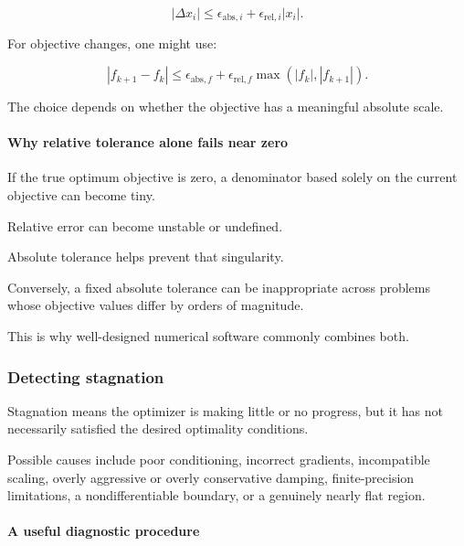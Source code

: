 \[
|\Delta x_i| \le \epsilon_{\mathrm{abs},i} + \epsilon_{\mathrm{rel},i}|x_i|.
\]

For objective changes, one might use:

\[
|f_{k+1}-f_k| \le \epsilon_{\mathrm{abs},f} + \epsilon_{\mathrm{rel},f}\max(|f_k|,|f_{k+1}|).
\]

The choice depends on whether the objective has a meaningful absolute scale.

\paragraph{Why relative tolerance alone fails near zero}\label{02-foundations-ii-ch027-why-relative-tolerance-alone-fails-near-zero}

\hypertarget{02-foundations-ii-ch027-why-relative-tolerance-alone-fails-near-zero}{}

If the true optimum objective is zero, a denominator based solely on the current objective can become tiny.

Relative error can become unstable or undefined.

Absolute tolerance helps prevent that singularity.

Conversely, a fixed absolute tolerance can be inappropriate across problems whose objective values differ by orders of magnitude.

This is why well-designed numerical software commonly combines both.

\subsubsection{Detecting stagnation}\label{02-foundations-ii-ch027-detecting-stagnation}

\hypertarget{02-foundations-ii-ch027-detecting-stagnation}{}

Stagnation means the optimizer is making little or no progress, but it has not necessarily satisfied the desired optimality conditions.

Possible causes include poor conditioning, incorrect gradients, incompatible scaling, overly aggressive or overly conservative damping, finite-precision limitations, a nondifferentiable boundary, or a genuinely nearly flat region.

\paragraph{A useful diagnostic procedure}\label{02-foundations-ii-ch027-a-useful-diagnostic-procedure}

